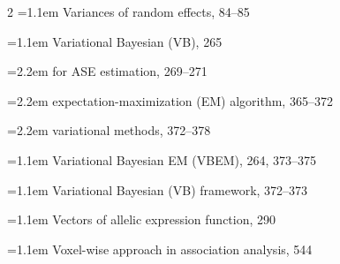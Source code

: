 \begin{multicols}{2}
\noindent\hangindent=1.1em Variances of random effects, 84--85\par
\noindent\hangindent=1.1em Variational Bayesian (VB), 265\par
\noindent\hangindent=2.2em \hspace*{1.1em}for ASE estimation, 269--271\par
\noindent\hangindent=2.2em \hspace*{1.1em}expectation-maximization (EM) algorithm, 365--372\par
\noindent\hangindent=2.2em \hspace*{1.1em}variational methods, 372--378\par
\noindent\hangindent=1.1em Variational Bayesian EM (VBEM), 264, 373--375\par
\noindent\hangindent=1.1em Variational Bayesian (VB) framework, 372--373\par
\noindent\hangindent=1.1em Vectors of allelic expression function, 290\par
\noindent\hangindent=1.1em Voxel-wise approach in association analysis, 544\par


\end{multicols}
